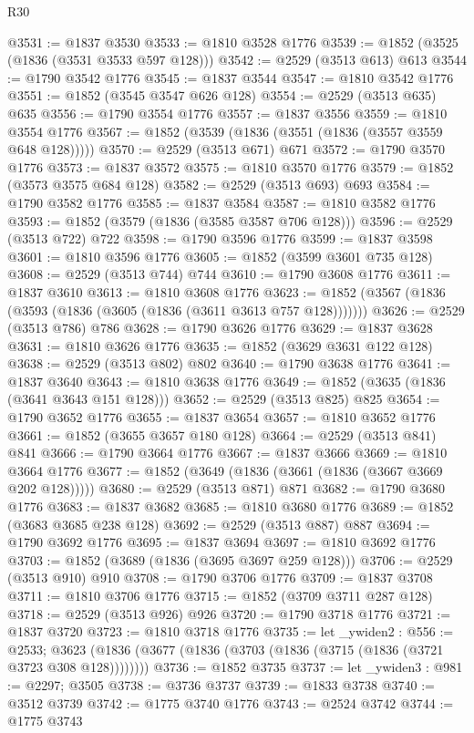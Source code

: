 \begin{lexlean}{R30}
\begin{coremodule}
@3531 := @1837 @3530
@3533 := @1810 @3528 @1776
@3539 := @1852 (@3525 (@1836 (@3531 @3533 @597 @128)))
@3542 := @2529 (@3513 @613) @613
@3544 := @1790 @3542 @1776
@3545 := @1837 @3544
@3547 := @1810 @3542 @1776
@3551 := @1852 (@3545 @3547 @626 @128)
@3554 := @2529 (@3513 @635) @635
@3556 := @1790 @3554 @1776
@3557 := @1837 @3556
@3559 := @1810 @3554 @1776
@3567 := @1852 (@3539 (@1836 (@3551 (@1836 (@3557 @3559 @648 @128)))))
@3570 := @2529 (@3513 @671) @671
@3572 := @1790 @3570 @1776
@3573 := @1837 @3572
@3575 := @1810 @3570 @1776
@3579 := @1852 (@3573 @3575 @684 @128)
@3582 := @2529 (@3513 @693) @693
@3584 := @1790 @3582 @1776
@3585 := @1837 @3584
@3587 := @1810 @3582 @1776
@3593 := @1852 (@3579 (@1836 (@3585 @3587 @706 @128)))
@3596 := @2529 (@3513 @722) @722
@3598 := @1790 @3596 @1776
@3599 := @1837 @3598
@3601 := @1810 @3596 @1776
@3605 := @1852 (@3599 @3601 @735 @128)
@3608 := @2529 (@3513 @744) @744
@3610 := @1790 @3608 @1776
@3611 := @1837 @3610
@3613 := @1810 @3608 @1776
@3623 := @1852 (@3567 (@1836 (@3593 (@1836 (@3605 (@1836 (@3611 @3613 @757 @128)))))))
@3626 := @2529 (@3513 @786) @786
@3628 := @1790 @3626 @1776
@3629 := @1837 @3628
@3631 := @1810 @3626 @1776
@3635 := @1852 (@3629 @3631 @122 @128)
@3638 := @2529 (@3513 @802) @802
@3640 := @1790 @3638 @1776
@3641 := @1837 @3640
@3643 := @1810 @3638 @1776
@3649 := @1852 (@3635 (@1836 (@3641 @3643 @151 @128)))
@3652 := @2529 (@3513 @825) @825
@3654 := @1790 @3652 @1776
@3655 := @1837 @3654
@3657 := @1810 @3652 @1776
@3661 := @1852 (@3655 @3657 @180 @128)
@3664 := @2529 (@3513 @841) @841
@3666 := @1790 @3664 @1776
@3667 := @1837 @3666
@3669 := @1810 @3664 @1776
@3677 := @1852 (@3649 (@1836 (@3661 (@1836 (@3667 @3669 @202 @128)))))
@3680 := @2529 (@3513 @871) @871
@3682 := @1790 @3680 @1776
@3683 := @1837 @3682
@3685 := @1810 @3680 @1776
@3689 := @1852 (@3683 @3685 @238 @128)
@3692 := @2529 (@3513 @887) @887
@3694 := @1790 @3692 @1776
@3695 := @1837 @3694
@3697 := @1810 @3692 @1776
@3703 := @1852 (@3689 (@1836 (@3695 @3697 @259 @128)))
@3706 := @2529 (@3513 @910) @910
@3708 := @1790 @3706 @1776
@3709 := @1837 @3708
@3711 := @1810 @3706 @1776
@3715 := @1852 (@3709 @3711 @287 @128)
@3718 := @2529 (@3513 @926) @926
@3720 := @1790 @3718 @1776
@3721 := @1837 @3720
@3723 := @1810 @3718 @1776
@3735 := let _ywiden2 : @556 := @2533;
  @3623 (@1836 (@3677 (@1836 (@3703 (@1836 (@3715 (@1836 (@3721 @3723 @308 @128))))))))
@3736 := @1852 @3735
@3737 := let _ywiden3 : @981 := @2297; @3505
@3738 := @3736 @3737
@3739 := @1833 @3738
@3740 := @3512 @3739
@3742 := @1775 @3740 @1776
@3743 := @2524 @3742
@3744 := @1775 @3743

\end{coremodule}
\end{lexlean}
